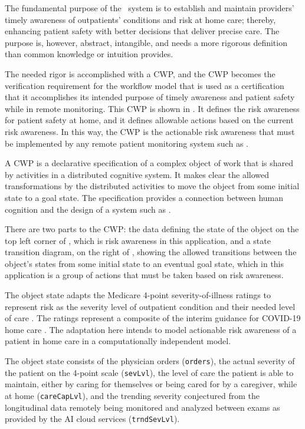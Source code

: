 The fundamental purpose of the \phware\ system is to establish and maintain providers' timely awareness of outpatients' conditions and risk at home care; thereby, enhancing patient safety with better decisions that deliver precise care. The purpose is, however, abstract, intangible, and needs a more rigorous definition than common knowledge or intuition provides. 

The needed rigor is accomplished with a CWP, and the CWP becomes the verification requirement for the workflow model that is used as a certification that it accomplishes its intended purpose of timely awareness and patient safety while in remote monitoring. This CWP is shown in . It defines the risk awareness for patient safety at home, and it defines allowable actions based on the current risk awareness. In this way, the CWP is the actionable risk awareness that must be implemented by any remote patient monitoring system such as \phware. 

A CWP is a declarative specification of a complex object of work that is shared by activities in a distributed cognitive system. It makes clear the allowed transformations by the distributed activities to move the object from some initial state to a goal state. The specification provides a connection between human cognition and the design of a system such as \phware.

There are two parts to the CWP: the data defining the state of the object on the top left corner of , which is risk awareness in this application, and a state transition diagram, on the right of , showing the allowed transitions between the object's states from some initial state to an eventual goal state, which in this application is a group of actions that must be taken based on risk awareness.

The object state adapts the Medicare 4-point severity-of-illness ratings to represent risk as the severity level of outpatient condition and their needed level of care \cite{severity,Hornbrook2005OverviewOD}. The ratings represent a composite of the interim guidance for COVID-19 home care \cite{cdc}. The adaptation here intends to model actionable risk awareness of a patient in home care in a computationally independent model. 

The object state consists of the physician orders (\texttt{orders}), the actual severity of the patient on the 4-point scale (\texttt{sevLvl}), the level of care the patient is able to maintain, either by caring for themselves or being cared for by a caregiver, while at home (\texttt{careCapLvl}), and the trending severity conjectured from the longitudinal data remotely being monitored and analyzed between exams as provided by the AI cloud services (\texttt{trndSevLvl}).


